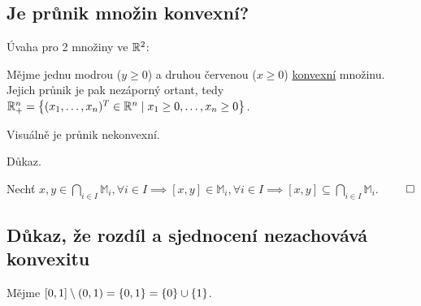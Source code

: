 \subsection{Je průnik množin konvexní?}
Úvaha pro 2 množiny ve $\mathbb{R}^2$:

\begin{multicols}{2}
    Mějme jednu modrou ($y \geq 0$) a druhou červenou ($x \geq 0$) \hyperref[sec:konvex]{konvexní} množinu. Jejich průnik je pak nezáporný ortant,
    tedy \\ 
    $\mathbb{R}_+^n = \left\lbrace (x_1, \dots, x_n)^T \in \mathbb{R}^n \mid x_1 \geq 0, \dots, x_n \geq 0 \right\rbrace$.

    Visuálně je průnik nekonvexní.

    Důkaz.

    Nechť ${x,y \in \bigcap\limits_{i \in I} \mathbb{M}_{i}, \forall i \in I \implies [x, y] \in \mathbb{M}_i, \forall i \in I
    \implies [x,y] \subseteq \bigcap\limits_{i \in I} \mathbb{M}_{i}.}$
    $\qed$

\columnbreak

    \begin{center}
    \end{center}
\end{multicols}

\subsection{Důkaz, že rozdíl a sjednocení nezachovává konvexitu}
Mějme $[0,1] \setminus (0,1) = \left\lbrace 0,1 \right\rbrace = \left\lbrace 0 \right\rbrace \cup \left\lbrace 1 \right\rbrace$.

